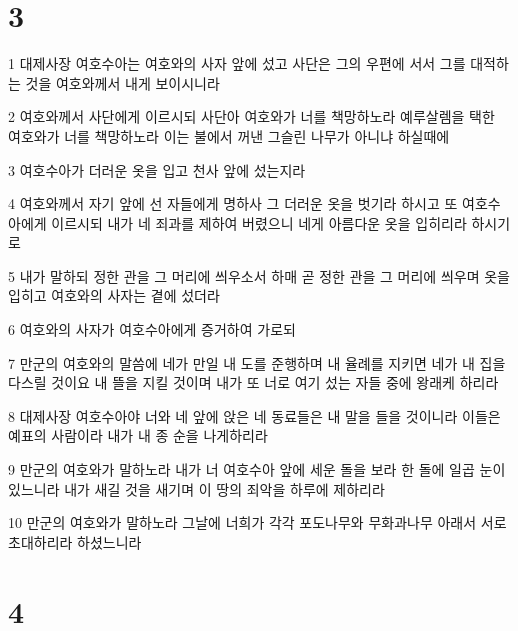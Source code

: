 \chapter{3}

\par 1 대제사장 여호수아는 여호와의 사자 앞에 섰고 사단은 그의 우편에 서서 그를 대적하는 것을 여호와께서 내게 보이시니라
\par 2 여호와께서 사단에게 이르시되 사단아 여호와가 너를 책망하노라 예루살렘을 택한 여호와가 너를 책망하노라 이는 불에서 꺼낸 그슬린 나무가 아니냐 하실때에
\par 3 여호수아가 더러운 옷을 입고 천사 앞에 섰는지라
\par 4 여호와께서 자기 앞에 선 자들에게 명하사 그 더러운 옷을 벗기라 하시고 또 여호수아에게 이르시되 내가 네 죄과를 제하여 버렸으니 네게 아름다운 옷을 입히리라 하시기로
\par 5 내가 말하되 정한 관을 그 머리에 씌우소서 하매 곧 정한 관을 그 머리에 씌우며 옷을 입히고 여호와의 사자는 곁에 섰더라
\par 6 여호와의 사자가 여호수아에게 증거하여 가로되
\par 7 만군의 여호와의 말씀에 네가 만일 내 도를 준행하며 내 율례를 지키면 네가 내 집을 다스릴 것이요 내 뜰을 지킬 것이며 내가 또 너로 여기 섰는 자들 중에 왕래케 하리라
\par 8 대제사장 여호수아야 너와 네 앞에 앉은 네 동료들은 내 말을 들을 것이니라 이들은 예표의 사람이라 내가 내 종 순을 나게하리라
\par 9 만군의 여호와가 말하노라 내가 너 여호수아 앞에 세운 돌을 보라 한 돌에 일곱 눈이 있느니라 내가 새길 것을 새기며 이 땅의 죄악을 하루에 제하리라
\par 10 만군의 여호와가 말하노라 그날에 너희가 각각 포도나무와 무화과나무 아래서 서로 초대하리라 하셨느니라

\chapter{4}

